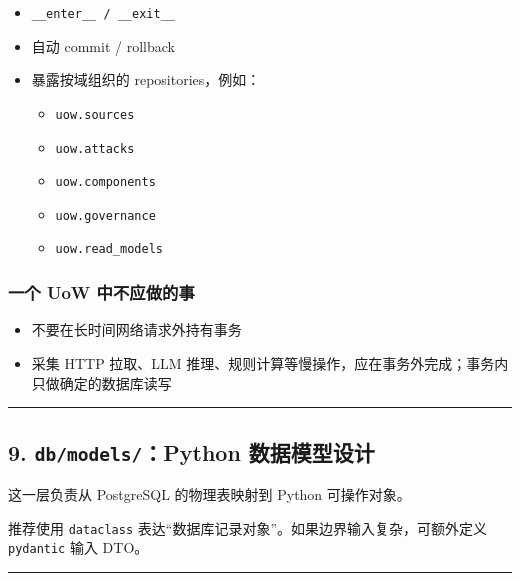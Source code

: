 \documentclass[UTF8]{ctexart}
\providecommand{\tightlist}{%
  \setlength{\itemsep}{0pt}\setlength{\parskip}{0pt}}
\begin{document}
\begin{itemize}
\tightlist
\item
  \texttt{\_\_enter\_\_\ /\ \_\_exit\_\_}
\item
  自动 commit / rollback
\item
  暴露按域组织的 repositories，例如：

  \begin{itemize}
  \tightlist
  \item
    \texttt{uow.sources}
  \item
    \texttt{uow.attacks}
  \item
    \texttt{uow.components}
  \item
    \texttt{uow.governance}
  \item
    \texttt{uow.read\_models}
  \end{itemize}
\end{itemize}

\hypertarget{ux4e00ux4e2a-uow-ux4e2dux4e0dux5e94ux505aux7684ux4e8b}{%
\subsubsection{一个 UoW
中不应做的事}\label{ux4e00ux4e2a-uow-ux4e2dux4e0dux5e94ux505aux7684ux4e8b}}

\begin{itemize}
\tightlist
\item
  不要在长时间网络请求外持有事务
\item
  采集 HTTP 拉取、LLM
  推理、规则计算等慢操作，应在事务外完成；事务内只做确定的数据库读写
\end{itemize}

\begin{center}\rule{0.5\linewidth}{0.5pt}\end{center}

\hypertarget{dbmodelspython-ux6570ux636eux6a21ux578bux8bbeux8ba1}{%
\subsection{\texorpdfstring{9. \texttt{db/models/}：Python
数据模型设计}{9. db/models/：Python 数据模型设计}}\label{dbmodelspython-ux6570ux636eux6a21ux578bux8bbeux8ba1}}

这一层负责从 PostgreSQL 的物理表映射到 Python 可操作对象。

推荐使用 \texttt{dataclass}
表达``数据库记录对象''。如果边界输入复杂，可额外定义 \texttt{pydantic}
输入 DTO。

\begin{center}\rule{0.5\linewidth}{0.5pt}\end{center}
\end{document}
